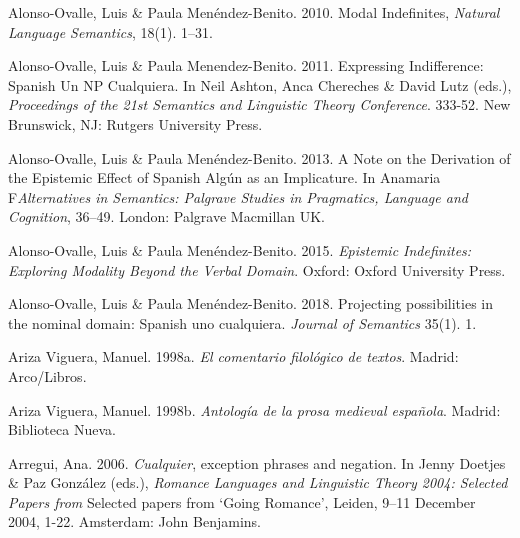 \begin{styleStandard}
Alonso-Ovalle, Luis \& Paula Menéndez-Benito. 2010. Modal Indefinites, \emph{\textmd{\textit{Natural Language Semantics}}}, 18(1). 1–31.
\end{styleStandard}

\begin{styleStandard}
Alonso-Ovalle, Luis \& Paula Menendez-Benito. 2011. Expressing Indifference: Spanish Un NP Cualquiera. In Neil Ashton, Anca Chereches \& David Lutz (eds.), \textit{Proceedings of the 21st Semantics and Linguistic Theory Conference}. 333-52. New Brunswick, NJ: Rutgers University Press.
\end{styleStandard}

\begin{styleStandard}
Alonso-Ovalle, Luis \& Paula Menéndez-Benito. 2013. A Note on the Derivation of the Epistemic Effect of Spanish Algún as an Implicature. In Anamaria F\textit{Alternatives in Semantics: Palgrave Studies in Pragmatics, Language and Cognition}, 36–49. London: Palgrave Macmillan UK.
\end{styleStandard}

\begin{styleStandard}
Alonso-Ovalle, Luis \& Paula Menéndez-Benito. 2015. \textit{Epistemic Indefinites: Exploring Modality Beyond the Verbal Domain}. Oxford: Oxford University Press.
\end{styleStandard}

\begin{styleStandard}
Alonso-Ovalle, Luis \& Paula Menéndez-Benito. 2018. Projecting possibilities in the nominal domain: Spanish uno cualquiera. \textit{Journal of Semantics} 35(1). 1.
\end{styleStandard}

\begin{styleStandard}
Ariza Viguera, Manuel. 1998a. \textit{El comentario filológico de textos}. Madrid: Arco/Libros.
\end{styleStandard}

\begin{styleStandard}
Ariza Viguera, Manuel. 1998b. \textit{Antología de la prosa medieval española}. Madrid: Biblioteca Nueva.
\end{styleStandard}

\begin{styleStandard}
Arregui, Ana. 2006. \textit{Cualquier}, exception phrases and negation. In Jenny Doetjes \& Paz González (eds.), \textit{Romance Languages and Linguistic Theory 2004: Selected Papers from }Selected papers from ‘Going Romance’, Leiden, 9–11 December 2004, 1-22. Amsterdam: John Benjamins.
\end{styleStandard}

